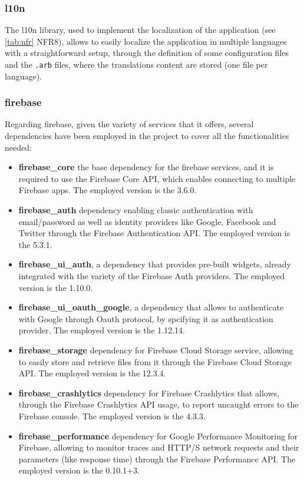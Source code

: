 \subsubsection{l10n}
The l10n library, used to implement the localization of the application (see \cref{tab:nfr} NFR8), allows to easily localize the application in multiple languages with a straightforward setup, through the definition of some configuration files and the \texttt{.arb} files, where the translations content are stored (one file per language). 
\newpage
\subsubsection{firebase}
Regarding firebase, given the variety of services that it offers, several dependencies have been employed in the project to cover all the functionalities needed:

\begin{itemize}[nosep] %
    \item \textbf{firebase\_core\:} the base dependency for the firebase services, and it is required to use the Firebase Core API, which enables connecting to multiple Firebase apps. The employed version is the 3.6.0.
    \item \textbf{firebase\_auth\:} dependency enabling classic authentication with email/password as well as identity providers like Google, Facebook and Twitter through the Firebase Authentication API. The employed version is the 5.3.1.
    \item \textbf{firebase\_ui\_auth}, a dependency that provides pre-built widgets, already integrated with the variety of the Firebase Auth providers. The employed version is the 1.10.0.
    \item \textbf{firebase\_ui\_oauth\_google}, a dependency that allows to authenticate with Google through Oauth protocol, by spcifying it as authentication provider. The employed version is the 1.12.14.
    \item \textbf{firebase\_storage\:} dependency for Firebase Cloud Storage service, allowing to easily store and retrieve files from it through the Firebase Cloud Storage API. The employed version is the 12.3.4.
    \item \textbf{firebase\_crashlytics\:} dependency for Firebase Crashlytics that allows, through the Firebase Crashlytics API usage, to report uncaught errors to the Firebase console. The employed version is the 4.3.3.
    \item \textbf{firebase\_performance\:} dependency for Google Performance Monitoring for Firebase, allowing to monitor traces and HTTP/S network requests and their parameters (like response time) through the Firebase Performance API. The employed version is the 0.10.1+3.
\end{itemize}

